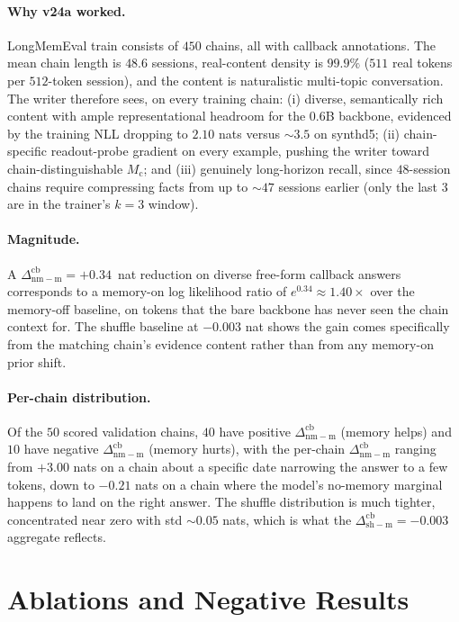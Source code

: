 \documentclass[11pt]{article}
\newcommand{\Mc}{M_{\mathrm{c}}}
\newcommand{\dnm}{\Delta_{\mathrm{nm{-}m}}}
\newcommand{\dsh}{\Delta_{\mathrm{sh{-}m}}}
\begin{document}
\paragraph{Why v24a worked.}
LongMemEval train consists of $450$ chains, all with callback
annotations. The mean chain length is
$48.6$ sessions, real-content density is $99.9\%$ ($511$ real tokens
per $512$-token session), and the content is naturalistic
multi-topic conversation. The writer therefore sees, on every
training chain: (i) diverse, semantically rich content with ample
representational headroom for the 0.6B backbone, evidenced by the
training NLL dropping to $2.10$ nats versus $\sim 3.5$ on synthd5;
(ii) chain-specific readout-probe gradient on every example, pushing
the writer toward chain-distinguishable $\Mc$; and (iii) genuinely
long-horizon recall, since $48$-session chains require compressing
facts from up to $\sim 47$ sessions earlier (only the last 3 are in
the trainer's $k{=}3$ window).

\paragraph{Magnitude.} A $\dnm^{\mathrm{cb}} = +0.34$~nat reduction on
diverse free-form callback answers corresponds to a memory-on log
likelihood ratio of $e^{0.34}\approx 1.40\times$ over the
memory-off baseline, on tokens that the bare backbone has never
seen the chain context for. The shuffle baseline at $-0.003$ nat
shows the gain comes specifically from the matching chain's evidence
content rather than from any memory-on prior shift.

\paragraph{Per-chain distribution.}
Of the $50$ scored validation chains, $40$ have positive
$\dnm^{\mathrm{cb}}$ (memory helps) and $10$ have negative
$\dnm^{\mathrm{cb}}$ (memory hurts), with the per-chain
$\dnm^{\mathrm{cb}}$ ranging from $+3.00$ nats on a chain about a
specific date narrowing the answer to a few tokens, down to
$-0.21$ nats on a chain where the model's no-memory marginal
happens to land on the right answer. The shuffle distribution is much tighter,
concentrated near zero with std $\sim 0.05$ nats, which is what
the $\dsh^{\mathrm{cb}} = -0.003$ aggregate reflects.

\section{Ablations and Negative Results}
\label{sec:negatives}
\end{document}
